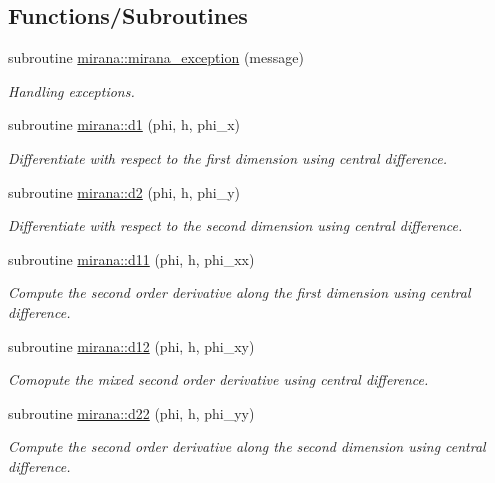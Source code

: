 \subsection*{Functions/\+Subroutines}
\begin{DoxyCompactItemize}
\item 
subroutine \hyperlink{namespacemirana_ab002a22665f70b4c65bdcf70ac96d768}{mirana\+::mirana\+\_\+exception} (message)
\begin{DoxyCompactList}\small\item\em Handling exceptions. \end{DoxyCompactList}\item 
subroutine \hyperlink{namespacemirana_a4009036e8b04ac992641e36d34ab0ed4}{mirana\+::d1} (phi, h, phi\+\_\+x)
\begin{DoxyCompactList}\small\item\em Differentiate with respect to the first dimension using central difference. \end{DoxyCompactList}\item 
subroutine \hyperlink{namespacemirana_a21348ffe170eafc6fc2a009256b1b6e3}{mirana\+::d2} (phi, h, phi\+\_\+y)
\begin{DoxyCompactList}\small\item\em Differentiate with respect to the second dimension using central difference. \end{DoxyCompactList}\item 
subroutine \hyperlink{namespacemirana_ab9b1e7b5e38c6a020e05196b452e6d02}{mirana\+::d11} (phi, h, phi\+\_\+xx)
\begin{DoxyCompactList}\small\item\em Compute the second order derivative along the first dimension using central difference. \end{DoxyCompactList}\item 
subroutine \hyperlink{namespacemirana_ad3ac07295401fa4e0da8c4fa3bcc2cd4}{mirana\+::d12} (phi, h, phi\+\_\+xy)
\begin{DoxyCompactList}\small\item\em Comopute the mixed second order derivative using central difference. \end{DoxyCompactList}\item 
subroutine \hyperlink{namespacemirana_a9161b0947ddd188ac99d9246a1d81aed}{mirana\+::d22} (phi, h, phi\+\_\+yy)
\begin{DoxyCompactList}\small\item\em Compute the second order derivative along the second dimension using central difference. \end{DoxyCompactList}\item 

\end{DoxyCompactItemize}
